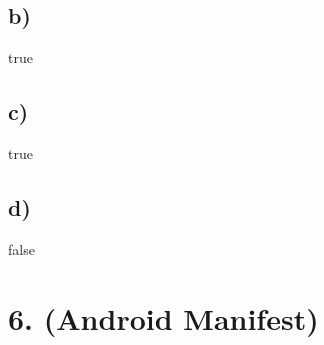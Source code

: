 \documentclass[10pt,a4paper]{report}
\begin{document}
		\subsection*{b)}
			true
		
		\subsection*{c)}
			true
		
		\subsection*{d)}
			false
	
	\section*{6. (Android Manifest)}
	
	
\end{document}
